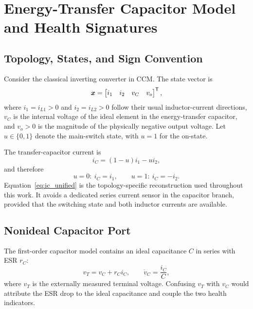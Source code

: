 \section{Energy-Transfer Capacitor Model and Health Signatures}
\label{sec:modeling}

\subsection{Topology, States, and Sign Convention}

Consider the classical inverting \Cuk{} converter in CCM. The state vector is
\begin{equation}
\bm{x}=\begin{bmatrix}i_1&i_2&v_C&v_o\end{bmatrix}^{\mathsf T},
\label{eq:state_vector}
\end{equation}
where $i_1=i_{L1}>0$ and $i_2=i_{L2}>0$ follow their usual inductor-current directions, $v_C$ is the internal voltage of the ideal element in the energy-transfer capacitor, and $v_o>0$ is the magnitude of the physically negative output voltage. Let $u\in\{0,1\}$ denote the main-switch state, with $u=1$ for the on-state.

The transfer-capacitor current is
\begin{equation}
i_C=(1-u)i_1-ui_2,
\label{eq:ic_unified}
\end{equation}
and therefore
\begin{equation}
u=0:\ i_C=i_1, \qquad u=1:\ i_C=-i_2.
\label{eq:ic_states}
\end{equation}
Equation~\eqref{eq:ic_unified} is the topology-specific reconstruction used throughout this work. It avoids a dedicated series current sensor in the capacitor branch, provided that the switching state and both inductor currents are available.

\subsection{Nonideal Capacitor Port}

The first-order capacitor model contains an ideal capacitance $C$ in series with ESR $r_C$:
\begin{equation}
v_T=v_C+r_C i_C, \qquad \dot v_C=\frac{i_C}{C},
\label{eq:cap_port}
\end{equation}
where $v_T$ is the externally measured terminal voltage. Confusing $v_T$ with $v_C$ would attribute the ESR drop to the ideal capacitance and couple the two health indicators.

